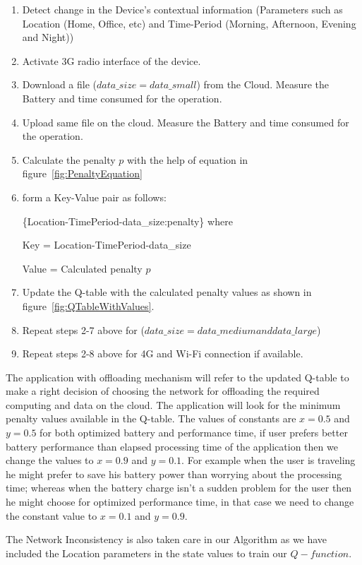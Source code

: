 \documentclass{report}
\begin{document}
\begin{enumerate}
\item Detect change in the Device's contextual information (Parameters such as Location (Home, Office, etc) and Time-Period (Morning, Afternoon, Evening and Night))

\item Activate 3G radio interface of the device.
\item Download a file ($ data\_size = data\_small $) from the Cloud. Measure the Battery and time consumed for the operation.
\item Upload same file on the cloud. Measure the Battery and time consumed for the operation.
\item Calculate the penalty $p$ with the help of equation in figure~\ref{fig:PenaltyEquation}
\item form a Key-Value pair as follows:

\{Location-TimePeriod-data\_size:penalty\} where

Key = Location-TimePeriod-data\_size

Value = Calculated penalty $p$

\item Update the Q-table with the calculated penalty values as shown in figure~\ref{fig:QTableWithValues}.
\item Repeat steps 2-7 above for ($ data\_size = data\_medium and data\_large $)
\item Repeat steps 2-8 above for 4G and Wi-Fi connection if available.
\end{enumerate}

The application with offloading mechanism will refer to the updated Q-table to make a right decision of choosing the network
for offloading the required computing and data on the cloud. The application will look for the minimum penalty values available in the Q-table. The values of constants are $ x = 0.5 $ and $ y = 0.5 $ for both optimized battery and performance time, if user prefers better battery performance than elapsed processing time of the application then we change the values to $ x = 0.9 $ and $ y = 0.1 $. For example when the user is traveling he might prefer to save his battery power than worrying about the processing time; whereas when the battery charge isn't a sudden problem for the user then he might choose for optimized performance time, in that case we need to change the constant value to $x = 0.1$ and $y = 0.9$.

The Network Inconsistency is also taken care in our Algorithm as we have included the Location parameters in the state values to train our $Q-function$.
\end{document}

